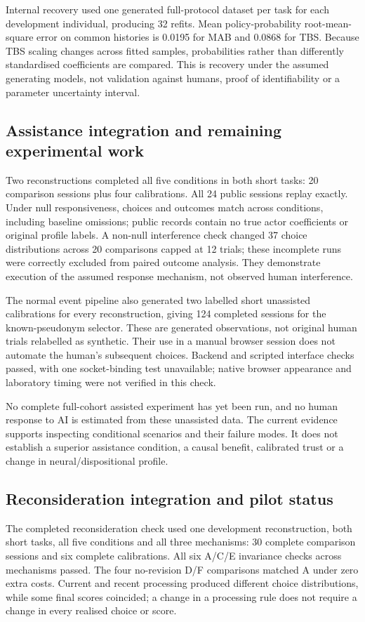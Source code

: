 \documentclass[11pt,a4paper]{article}
\begin{document}
Internal recovery used one generated full-protocol dataset per task for each development individual, producing 32 refits. Mean policy-probability root-mean-square error on common histories is 0.0195 for MAB and 0.0868 for TBS. Because TBS scaling changes across fitted samples, probabilities rather than differently standardised coefficients are compared. This is recovery under the assumed generating models, not validation against humans, proof of identifiability or a parameter uncertainty interval.

\subsection{Assistance integration and remaining experimental work}
Two reconstructions completed all five conditions in both short tasks: 20 comparison sessions plus four calibrations. All 24 public sessions replay exactly. Under null responsiveness, choices and outcomes match across conditions, including baseline omissions; public records contain no true actor coefficients or original profile labels. A non-null interference check changed 37 choice distributions across 20 comparisons capped at 12 trials; these incomplete runs were correctly excluded from paired outcome analysis. They demonstrate execution of the assumed response mechanism, not observed human interference.

The normal event pipeline also generated two labelled short unassisted calibrations for every reconstruction, giving 124 completed sessions for the known-pseudonym selector. These are generated observations, not original human trials relabelled as synthetic. Their use in a manual browser session does not automate the human's subsequent choices. Backend and scripted interface checks passed, with one socket-binding test unavailable; native browser appearance and laboratory timing were not verified in this check.

No complete full-cohort assisted experiment has yet been run, and no human response to AI is estimated from these unassisted data. The current evidence supports inspecting conditional scenarios and their failure modes. It does not establish a superior assistance condition, a causal benefit, calibrated trust or a change in neural/dispositional profile.

\subsection{Reconsideration integration and pilot status}
\label{sec:reconsideration-checks}
The completed reconsideration check used one development reconstruction, both short tasks, all five conditions and all three mechanisms: 30 complete comparison sessions and six complete calibrations. All six A/C/E invariance checks across mechanisms passed. The four no-revision D/F comparisons matched A under zero extra costs. Current and recent processing produced different choice distributions, while some final scores coincided; a change in a processing rule does not require a change in every realised choice or score.
\end{document}
